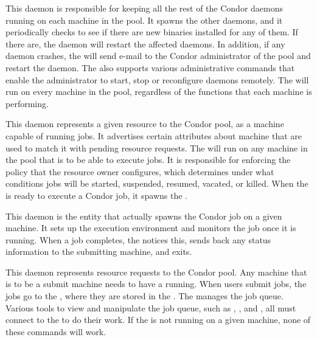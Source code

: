 \begin{description} 

\item[\Condor{master}] This daemon
is responsible for keeping all the
rest of the Condor daemons running on each machine in the pool.  It
spawns the other daemons, and it periodically checks to see if there are
new binaries installed for any of them.  If there are, the 
 daemon will
restart the affected daemons.  In addition, if any daemon crashes, the
 will send e-mail to the Condor administrator of the pool and
restart the daemon.  The  also supports various
administrative commands that enable the administrator to start, 
stop or reconfigure daemons remotely.  
The  will run on every machine in
the pool, regardless of the functions that each machine is performing.  

\item[\Condor{startd}] This daemon
represents a given resource to the Condor pool,  
as a machine capable of running jobs. 
It advertises certain attributes about machine that are used to
match it with pending resource requests.  
The  will run on any
machine in the pool that is to be able to execute jobs.  
It is responsible for enforcing the policy that the resource owner configures,
which determines under what conditions jobs will be started,
suspended, resumed, vacated, or killed.
When the  is ready to
execute a Condor job, it spawns the .

\item[\Condor{starter}] This daemon
is the entity that actually
spawns the Condor job on a given machine.  It sets up the
execution environment and monitors the job once it is running.  When a
job completes, the  notices this, sends back any status
information to the submitting machine, and exits.

\item[\Condor{schedd}] This daemon
represents resource requests to
the Condor pool.  Any machine that is to be a submit machine
needs to have a  running.  
When users submit jobs, 
the jobs go to the , where they are stored in the 
.
The  manages the job queue.
Various tools to view and
manipulate the job queue,
such as , , and ,
all must connect to the  to do their work.  If the
 is not running on a given machine, 
none of these commands will work.  


\end{description}
